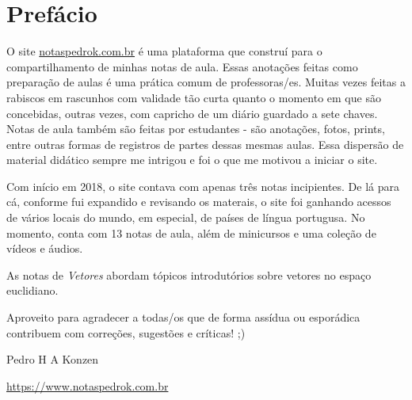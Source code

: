 
\chapter*{Prefácio}\label{prefacio}

O site \href{https://www.notaspedrok.com.br}{notaspedrok.com.br} é uma plataforma que construí para o compartilhamento de minhas notas de aula. Essas anotações feitas como preparação de aulas é uma prática comum de professoras/es. Muitas vezes feitas a rabiscos em rascunhos com validade tão curta quanto o momento em que são concebidas, outras vezes, com capricho de um diário guardado a sete chaves. Notas de aula também são feitas por estudantes - são anotações, fotos, prints, entre outras formas de registros de partes dessas mesmas aulas. Essa dispersão de material didático sempre me intrigou e foi o que me motivou a iniciar o site.

Com início em 2018, o site contava com apenas três notas incipientes. De lá para cá, conforme fui expandido e revisando os materais, o site foi ganhando acessos de vários locais do mundo, em especial, de países de língua portugusa. No momento, conta com 13 notas de aula, além de minicursos e uma coleção de vídeos e áudios.

As notas de \emph{Vetores} abordam tópicos introdutórios sobre vetores no espaço euclidiano.

Aproveito para agradecer a todas/os que de forma assídua ou esporádica contribuem com correções, sugestões e críticas! ;)

\begin{flushright}
  Pedro H A Konzen

  \url{https://www.notaspedrok.com.br}
\end{flushright}
